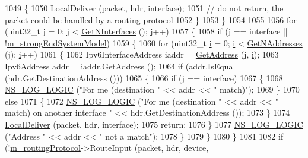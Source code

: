 \begin{DoxyCode}
1049         \{
1050           \hyperlink{classns3_1_1Ipv6L3Protocol_a8e2c7a80851d870812295c19dc908a38}{LocalDeliver} (packet, hdr, interface);
1051           \textcolor{comment}{// do not return, the packet could be handled by a routing protocol}
1052         \}
1053     \}
1054 
1055 
1056   \textcolor{keywordflow}{for} (uint32\_t j = 0; j < \hyperlink{classns3_1_1Ipv6L3Protocol_a53882c40f6fb32e2a6fe0a7a2858698d}{GetNInterfaces} (); j++)
1057     \{
1058       \textcolor{keywordflow}{if} (j == interface || !\hyperlink{classns3_1_1Ipv6L3Protocol_ac00aee071bc7ab2096efbf8fdc5e3814}{m\_strongEndSystemModel})
1059         \{
1060           \textcolor{keywordflow}{for} (uint32\_t \hyperlink{bernuolliDistribution_8m_a6f6ccfcf58b31cb6412107d9d5281426}{i} = 0; \hyperlink{bernuolliDistribution_8m_a6f6ccfcf58b31cb6412107d9d5281426}{i} < \hyperlink{classns3_1_1Ipv6L3Protocol_a3b09a9f504a311ecc08fdc026d897514}{GetNAddresses} (j); \hyperlink{bernuolliDistribution_8m_a6f6ccfcf58b31cb6412107d9d5281426}{i}++)
1061             \{
1062               Ipv6InterfaceAddress iaddr = \hyperlink{classns3_1_1Ipv6L3Protocol_a0321a9ac3f79b5a7b7542cecf11bfe44}{GetAddress} (j, \hyperlink{bernuolliDistribution_8m_a6f6ccfcf58b31cb6412107d9d5281426}{i});
1063               Ipv6Address addr = iaddr.GetAddress ();
1064               \textcolor{keywordflow}{if} (addr.IsEqual (hdr.GetDestinationAddress ()))
1065                 \{
1066                   \textcolor{keywordflow}{if} (j == interface)
1067                     \{
1068                       \hyperlink{group__logging_ga88acd260151caf2db9c0fc84997f45ce}{NS\_LOG\_LOGIC} (\textcolor{stringliteral}{"For me (destination "} << addr << \textcolor{stringliteral}{" match)"});
1069                     \}
1070                   \textcolor{keywordflow}{else}
1071                     \{
1072                       \hyperlink{group__logging_ga88acd260151caf2db9c0fc84997f45ce}{NS\_LOG\_LOGIC} (\textcolor{stringliteral}{"For me (destination "} << addr << \textcolor{stringliteral}{" match) on another
       interface "} << hdr.GetDestinationAddress ());
1073                     \}
1074                   \hyperlink{classns3_1_1Ipv6L3Protocol_a8e2c7a80851d870812295c19dc908a38}{LocalDeliver} (packet, hdr, interface);
1075                   \textcolor{keywordflow}{return};
1076                 \}
1077               \hyperlink{group__logging_ga88acd260151caf2db9c0fc84997f45ce}{NS\_LOG\_LOGIC} (\textcolor{stringliteral}{"Address "} << addr << \textcolor{stringliteral}{" not a match"});
1078             \}
1079         \}
1080     \}
1081 
1082   \textcolor{keywordflow}{if} (!\hyperlink{classns3_1_1Ipv6L3Protocol_aa0df547e5240b218dc1f4742a2a00117}{m\_routingProtocol}->RouteInput (packet, hdr, device,

\end{DoxyCode}
